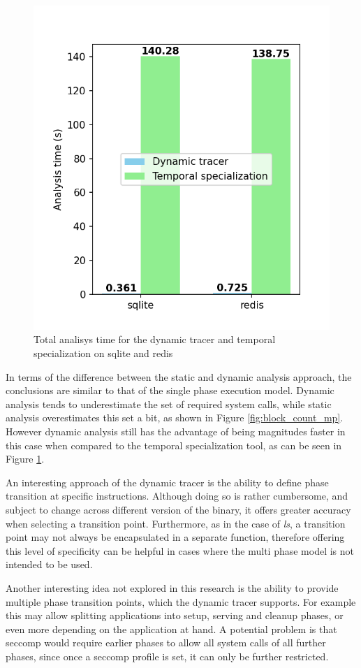 \begin{figure}
    \centering
    \includegraphics[width=\columnwidth]{./chart_multiphase_timings.png}
    \caption{Total analisys time for the dynamic tracer and temporal specialization on sqlite and redis}
    \label{fig:timings_mp}
\end{figure}
In terms of the difference between the static and dynamic analysis approach, the conclusions are similar to that of the single phase execution model.
Dynamic analysis tends to underestimate the set of required system calls, while static analysis overestimates this set a bit, as shown in Figure \ref{fig:block_count_mp}.
However dynamic analysis still has the advantage of being magnitudes faster in this case when compared to the temporal specialization tool, as can be seen in Figure \ref{fig:timings_mp}.

An interesting approach of the dynamic tracer is the ability to define phase transition at specific instructions.
Although doing so is rather cumbersome, and subject to change across different version of the binary, it offers greater accuracy when selecting a transition point.
Furthermore, as in the case of \textit{ls}, a transition point may not always be encapsulated in a separate function, therefore offering this level of specificity can be helpful in cases where the multi phase model is not intended to be used.

Another interesting idea not explored in this research is the ability to provide multiple phase transition points, which the dynamic tracer supports.
For example this may allow splitting applications into setup, serving and cleanup phases, or even more depending on the application at hand.
A potential problem is that seccomp would require earlier phases to allow all system calls of all further phases, since once a seccomp profile is set, it can only be further restricted.
